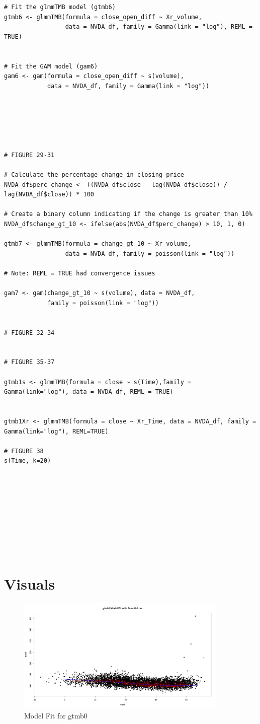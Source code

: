 \begin{verbatim}
# Fit the glmmTMB model (gtmb6)
gtmb6 <- glmmTMB(formula = close_open_diff ~ Xr_volume, 
                 data = NVDA_df, family = Gamma(link = "log"), REML = TRUE)


# Fit the GAM model (gam6)
gam6 <- gam(formula = close_open_diff ~ s(volume), 
            data = NVDA_df, family = Gamma(link = "log"))






# FIGURE 29-31

# Calculate the percentage change in closing price
NVDA_df$perc_change <- ((NVDA_df$close - lag(NVDA_df$close)) / lag(NVDA_df$close)) * 100

# Create a binary column indicating if the change is greater than 10%
NVDA_df$change_gt_10 <- ifelse(abs(NVDA_df$perc_change) > 10, 1, 0)

gtmb7 <- glmmTMB(formula = change_gt_10 ~ Xr_volume, 
                 data = NVDA_df, family = poisson(link = "log"))

# Note: REML = TRUE had convergence issues

gam7 <- gam(change_gt_10 ~ s(volume), data = NVDA_df, 
            family = poisson(link = "log"))


# FIGURE 32-34


# FIGURE 35-37

gtmb1s <- glmmTMB(formula = close ~ s(Time),family = Gamma(link="log"), data = NVDA_df, REML = TRUE)


gtmb1Xr <- glmmTMB(formula = close ~ Xr_Time, data = NVDA_df, family = Gamma(link="log"), REML=TRUE)

# FIGURE 38
s(Time, k=20)










\end{verbatim}
\newpage





\section{Visuals}

\begin{figure}[h]
    \centering
    \includegraphics[width=0.9\textwidth]{visuals/Model_fit_gtmb0.png}
    \caption{Model Fit for gtmb0}
    \label{fig:modfit_gtmb0}
\end{figure}

